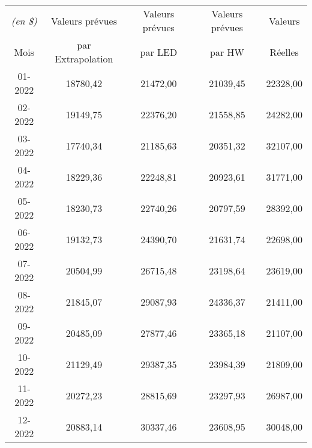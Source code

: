\begin{tabular}{ccccc}
\toprule
\textit{(en \$)} & Valeurs prévues & Valeurs prévues & Valeurs prévues & Valeurs \\
Mois  & par Extrapolation & par LED & par HW & Réelles \\
\cmidrule(lr){1-1}\cmidrule(lr){2-4}\cmidrule(lr){5-5}
01-2022 & 18780,42 & 21472,00 & 21039,45 & 22328,00 \\
02-2022 & 19149,75 & 22376,20 & 21558,85 & 24282,00 \\
03-2022 & 17740,34 & 21185,63 & 20351,32 & 32107,00 \\
04-2022 & 18229,36 & 22248,81 & 20923,61 & 31771,00 \\
05-2022 & 18230,73 & 22740,26 & 20797,59 & 28392,00 \\
06-2022 & 19132,73 & 24390,70 & 21631,74 & 22698,00 \\
07-2022 & 20504,99 & 26715,48 & 23198,64 & 23619,00 \\
08-2022 & 21845,07 & 29087,93 & 24336,37 & 21411,00 \\
09-2022 & 20485,09 & 27877,46 & 23365,18 & 21107,00 \\
10-2022 & 21129,49 & 29387,35 & 23984,39 & 21809,00 \\
11-2022 & 20272,23 & 28815,69 & 23297,93 & 26987,00 \\
12-2022 & 20883,14 & 30337,46 & 23608,95 & 30048,00 \\
\bottomrule
\end{tabular}%
